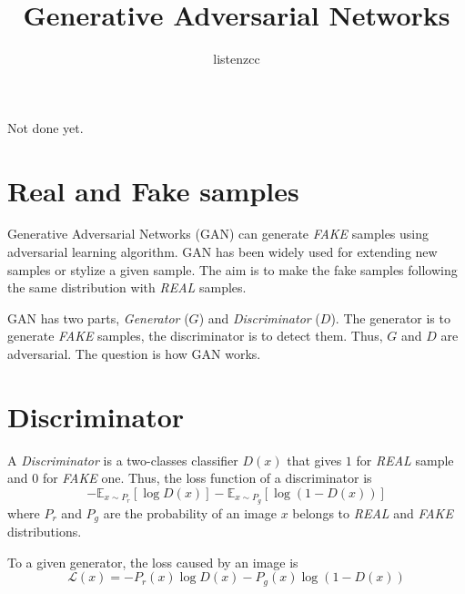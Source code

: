 \documentclass[a4paper]{article}
\title{Generative Adversarial Networks}
\author{listenzcc}
\begin{document}
\maketitle

\abstract
Not done yet.

\tableofcontents

\section{Real and Fake samples}
Generative Adversarial Networks (GAN) can generate \emph{FAKE} samples using adversarial learning algorithm.
GAN has been widely used for extending new samples or stylize a given sample.
The aim is to make the fake samples following the same distribution with \emph{REAL} samples.

GAN has two parts, \emph{Generator} ($G$) and \emph{Discriminator} ($D$).
The generator is to generate \emph{FAKE} samples, the discriminator is to detect them.
Thus, $G$ and $D$ are adversarial.
The question is how GAN works.

\section{Discriminator}
A \emph{Discriminator} is a two-classes classifier $D(x)$ that gives $1$ for \emph{REAL} sample and $0$ for \emph{FAKE} one.
Thus, the loss function of a discriminator is
\begin{equation}
    - \mathbb{E}_{x\sim P_r} [\log{D(x)}]
    - \mathbb{E}_{x\sim P_g} [\log{(1-D(x))}]
    \label{eq:D_loss}
\end{equation}
where $P_r$ and $P_g$ are the probability of an image $x$ belongs to \emph{REAL} and \emph{FAKE} distributions.

To a given generator, the loss caused by an image is
\begin{equation}
    \mathcal{L}{(x)} =
    - P_r(x) \log{D(x)}
    - P_g(x) \log{(1-D(x))}
\end{equation}
\end{document}
